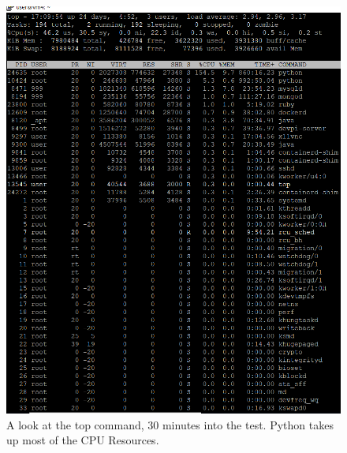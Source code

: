 \documentclass[12pt]{report}
\begin{document}
\begin{figure}[h!]
	\centering
	\includegraphics[width=\textwidth,height=\textheight,keepaspectratio]{intro/S2_harshit.png}
	\caption{A look at the top command, 30 minutes into the test. Python takes up most of the CPU Resources.}
\end{figure}
\end{document}
